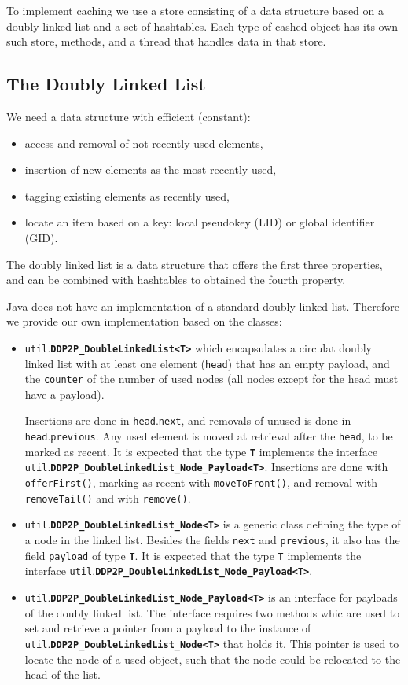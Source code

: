 \documentclass{book}
\newcommand{\pkg}[1]{{\tt #1}}
\newcommand{\cls}[1]{{\tt\bf #1}}
\newcommand{\mth}[1]{{\tt #1}}
\newcommand{\mmb}[1]{{\tt #1}}
\begin{document}
To implement caching we use a store consisting of a data structure
based on a doubly linked list and a set of hashtables.  Each type of
cashed object has its own such store, methods, and a thread that handles
data in that store.

\subsection{The Doubly Linked List}

We need a data structure with efficient (constant):
\begin{itemize}
\item
 access and removal of not recently used elements,
\item
 insertion of new elements as the most recently used,
\item
 tagging existing elements as recently used,
\item
 locate an item based on a key: local pseudokey (LID) or global identifier (GID).
\end{itemize}

The doubly linked list is a data structure that offers the first three properties,
and can be combined with hashtables to obtained the fourth property.

Java does not have an implementation of a standard doubly linked list.
Therefore we provide our own implementation based on the classes:
\begin{itemize}
\item
\pkg{util}.\cls{DDP2P\_DoubleLinkedList<T>} which encapsulates a
circulat doubly linked list with at least one element (\mmb{head})
that has an empty payload, and the \mmb{counter} of the number of used
nodes (all nodes except for the head must have a payload). 

Insertions are done in \mmb{head}.\mmb{next}, and removals of unused is done in \mmb{head}.\mmb{previous}.
Any used element is moved at retrieval after the \mmb{head}, to be marked as recent. 
It is expected that the type \cls{T} implements the interface
\pkg{util}.\cls{DDP2P\_DoubleLinkedList\_Node\_Payload<T>}.
Insertions are done with \mth{offerFirst()}, marking as recent with \mth{moveToFront()}, and removal with 
\mth{removeTail()} and with \mth{remove()}.
\item
\pkg{util}.\cls{DDP2P\_DoubleLinkedList\_Node<T>}
is a generic class defining the type of a node in the linked list. Besides the fields \mmb{next} and \mmb{previous},
it also has the field \mmb{payload} of type \cls{T}. It is expected that the type \cls{T} implements the interface
\pkg{util}.\cls{DDP2P\_DoubleLinkedList\_Node\_Payload<T>}.
\item
\pkg{util}.\cls{DDP2P\_DoubleLinkedList\_Node\_Payload<T>} is an interface for payloads of the
doubly linked list. The interface requires two methods whic are used to set and retrieve a
pointer from a payload to the instance of \pkg{util}.\cls{DDP2P\_DoubleLinkedList\_Node<T>} that
holds it. This pointer is used to locate the node of a used object, such that the node could be relocated to the head of the list.
\end{itemize}
\end{document}
